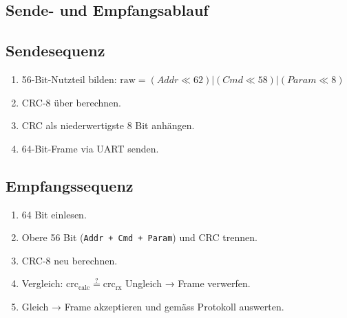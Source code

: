 \documentclass[main.tex]{subfiles} %
\begin{document}
\subsection*{Sende- und Empfangsablauf}

\subsection*{Sendesequenz}
\begin{enumerate}
  \item 56-Bit-Nutzteil bilden:
    \(\text{raw} = (Addr\ll62) | (Cmd\ll58) | (Param\ll8)\)
  \item CRC-8 über  berechnen.
  \item CRC als niederwertigste 8 Bit anhängen.
  \item 64-Bit-Frame via UART senden.
\end{enumerate}

\subsection*{Empfangssequenz}
\begin{enumerate}
  \item 64 Bit einlesen.
  \item Obere 56 Bit (\texttt{Addr + Cmd + Param}) und CRC trennen.
  \item CRC-8 neu berechnen.
  \item Vergleich:
    \(\text{crc}_{\text{calc}} \stackrel{?}{=} \text{crc}_{\text{rx}}\)
    Ungleich → Frame verwerfen.
  \item Gleich → Frame akzeptieren und gemäss Protokoll auswerten.
\end{enumerate}
\end{document}
